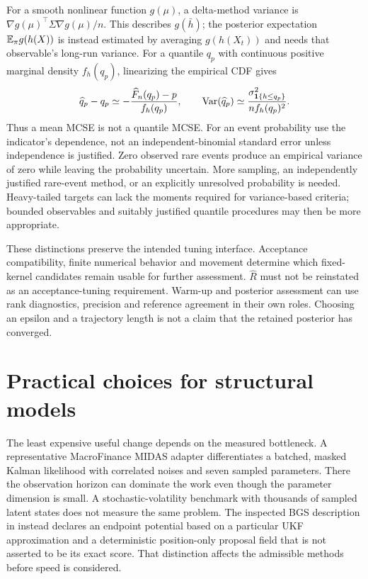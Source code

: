 For a smooth nonlinear function $g(\mu)$, a delta-method variance is
$\nabla g(\mu)^\top\Sigma\nabla g(\mu)/n$. This describes
$g(\bar h)$; the posterior expectation $\mathbb{E}_\pi g(h(X))$ is instead
estimated by averaging $g(h(X_t))$ and needs that observable's long-run
variance. For a quantile $q_p$ with continuous positive marginal density
$f_h(q_p)$, linearizing the empirical CDF gives
\begin{equation}
 \widehat q_p-q_p
 \simeq-\frac{\widehat F_n(q_p)-p}{f_h(q_p)},\qquad
 \operatorname{Var}(\widehat q_p)
 \simeq\frac{\sigma_{\mathbf1\{h\leq q_p\}}^2}
                    {n f_h(q_p)^2}.
 \label{eq:bf-modern-quantile-mcse}
\end{equation}
Thus a mean MCSE is not a quantile MCSE. For an event probability use the
indicator's dependence, not an independent-binomial standard error unless
independence is justified. Zero observed rare events produce an empirical
variance of zero while leaving the probability uncertain. More sampling,
an independently justified rare-event method, or an explicitly unresolved
probability is needed. Heavy-tailed targets can lack the moments required
for variance-based criteria; bounded observables and suitably justified
quantile procedures may then be more appropriate.

These distinctions preserve the intended tuning interface. Acceptance
compatibility, finite numerical behavior and movement determine which
fixed-kernel candidates remain usable for further assessment. $\widehat R$
must not be reinstated as an acceptance-tuning requirement. Warm-up and
posterior assessment can use rank diagnostics, precision and reference
agreement in their own roles. Choosing an epsilon and a trajectory length is
not a claim that the retained posterior has converged.

\section{Practical choices for structural models}
\label{sec:bf-modern-recommendations}

The least expensive useful change depends on the measured bottleneck.
A representative MacroFinance MIDAS adapter differentiates a batched,
masked Kalman likelihood with correlated noises and seven sampled
parameters. There the observation horizon can dominate the work even
though the parameter dimension is small. A stochastic-volatility benchmark
with thousands of sampled latent states does not measure the same problem.
The inspected BGS description in  instead declares an endpoint
potential based on a particular UKF approximation and a deterministic
position-only proposal field that is not asserted to be its exact score.
That distinction affects the admissible methods before speed is considered.


